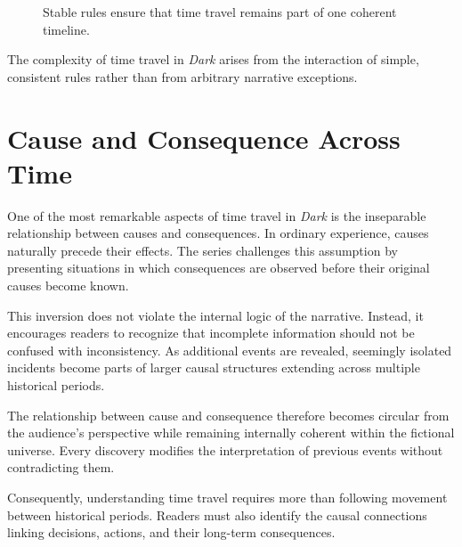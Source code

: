 \documentclass[12pt,oneside,openany]{book}
\begin{document}
\begin{figure}[H]
\centering
{}

\caption{Stable rules ensure that time travel remains part of one coherent timeline.}
\end{figure}

\begin{tcolorbox}[colback=blue!5,colframe=blue!60!black,title=Analysis]
The complexity of time travel in \textit{Dark} arises from the interaction of
simple, consistent rules rather than from arbitrary narrative exceptions.
\end{tcolorbox}
\section{Cause and Consequence Across Time}

One of the most remarkable aspects of time travel in \textit{Dark} is the
inseparable relationship between causes and consequences. In ordinary
experience, causes naturally precede their effects. The series challenges this
assumption by presenting situations in which consequences are observed before
their original causes become known.

This inversion does not violate the internal logic of the narrative. Instead,
it encourages readers to recognize that incomplete information should not be
confused with inconsistency. As additional events are revealed, seemingly
isolated incidents become parts of larger causal structures extending across
multiple historical periods.

The relationship between cause and consequence therefore becomes circular from
the audience's perspective while remaining internally coherent within the
fictional universe. Every discovery modifies the interpretation of previous
events without contradicting them.

Consequently, understanding time travel requires more than following movement
between historical periods. Readers must also identify the causal connections
linking decisions, actions, and their long-term consequences.
\end{document}
